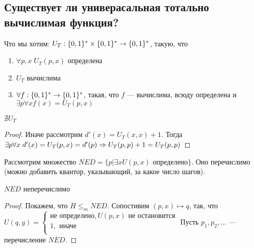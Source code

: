 \subsection{Существует ли универасальная тотально вычислимая функция?}
Что мы хотим: \(U_T: \{0, 1\}^* \times \{0, 1\}^* \rightarrow \{0, 1\}^*\), такую, что
\begin{enumerate}
    \item \(\forall p, x\;U_T(p, x)\) определена
    \item \(U_T\) вычислима
    \item \(\forall f: \{0, 1\}^* \rightarrow \{0, 1\}^*\), такая, что \(f\) --- вычислима, всюду определена и \(\exists p \forall x f(x) = U_T(p, x)\)
\end{enumerate}

\begin{proposition}
    \(\nexists U_T\)
\end{proposition}
\begin{proof}
    Иначе рассмотрим \(d'(x) = U_T(x, x) + 1\). Тогда \(\exists p \forall x\;d'(x) = U_T(p, x) = d'(p) \Rightarrow U_T(p, p) + 1 = U_T(p, p)\)
\end{proof}

Рассмотрим множество \(NED = \{p | \exists x U(p, x)\text{ определено}\}\). Оно перечислимо (можно добавить квантор, указывающий, за какое число шагов). 
\begin{proposition}
    \(\overline{NED}\) неперечислимо
\end{proposition}
\begin{proof}
    Покажем, что \(H \le_m NED\). Сопостивим \((p, x) \mapsto q\), так, что \(U(q, y) = \left\{\begin{array}{l}
        \text{не определено}, U(p, x) \text{ не остановится} \\
       1, \text{ иначе} \\
    \end{array}\right.\)
    Пусть \(p_1, p_2, \dots \) --- перечисление \(\overline{NED}\).
\end{proof}